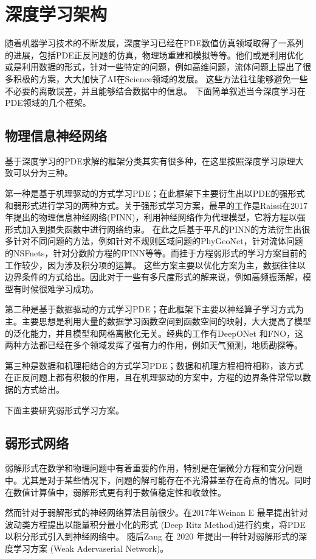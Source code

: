 \chapter{深度学习架构}
随着机器学习技术的不断发展，深度学习已经在PDE数值仿真领域取得了一系列的进展，包括PDE正反问题的仿真，物理场重建和模拟等等。他们或是利用优化或是利用数据的形式，针对一些特定的问题，例如高维问题，流体问题上提出了很多积极的方案，大大加快了AI在Science领域的发展。
这些方法往往能够避免一些不必要的离散误差，并且能够结合数据中的信息。
下面简单叙述当今深度学习在PDE领域的几个框架。
\section{物理信息神经网络}
基于深度学习的PDE求解的框架分类其实有很多种，在这里按照深度学习原理大致可以分为三种。

第一种是基于机理驱动的方式学习PDE；在此框架下主要衍生出以PDE的强形式和弱形式进行学习的两种方式。关于强形式学习方案，最早的工作是Raissi在2017年提出的物理信息神经网络(PINN)\cite{pinn}，利用神经网络作为代理模型，它将方程以强形式加入到损失函数中进行网络约束。
在此之后基于平凡的PINN的方法衍生出很多针对不同问题的方法，例如针对不规则区域问题的PhyGeoNet\cite{gao_phygeonet:_2020}，针对流体问题的NSFnets\cite{Wandel2021Learning}，针对分数阶方程的fPINN等等。而挂于方程弱形式的学习方案目前的工作较少，因为涉及积分项的运算。
这些方案主要以优化方案为主，数据往往以边界条件的方式给出。因此对于一些有多尺度形式的解来说，例如高频振荡解，模型有时候很难学习成功。

第二种是基于数据驱动的方式学习PDE；在此框架下主要以神经算子学习方式为主。主要思想是利用大量的数据学习函数空间到函数空间的映射，大大提高了模型的泛化能力，并且模型和网格离散化无关。经典的工作有DeepONet\cite{lu2021learning} 和FNO\cite{FNO}，这两种方法都已经在多个领域发挥了强有力的作用，例如天气预测，地质勘探等。

第三种是数据和机理相结合的方式学习PDE；数据和机理方程相符相称，该方式在正反问题上都有积极的作用，且在机理驱动的方案中，方程的边界条件常常以数据的方式给出。

下面主要研究弱形式学习方案。

\section{弱形式网络}
弱解形式在数学和物理问题中有着重要的作用，特别是在偏微分方程和变分问题中。尤其是对于某些情况下，问题的解可能存在不光滑甚至存在奇点的情况。同时在数值计算值中，弱解形式更有利于数值稳定性和收敛性。

然而针对于弱解形式的神经网络算法目前很少。在2017年Weinan E 最早提出针对波动类方程提出以能量积分最小化的形式 (Deep Ritz Method)\cite{DRM}进行约束，将PDE以积分形式引入到神经网络中。
随后Zang 在 2020 年提出一种针对弱解形式的深度学习方案 (Weak Adervaserial Network)\cite{ZANG_WAN}。

